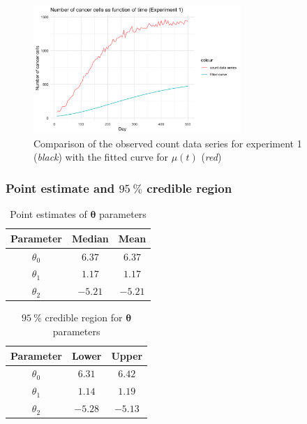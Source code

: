 \begin{figure}[H]
	\centering
	\includegraphics[width=0.7\textwidth]{figures/metropolis_vw_fitted_curve.png}
	\caption{Comparison of the observed count data series for experiment 1 (\textit{black}) with the fitted curve for $\mu(t)$ (\textit{red})}
	\label{fig:metropolis-vw-fitted-curve}
\end{figure}

\subsubsection*{Point estimate and $\SI{95}{\percent}$ credible region}

\begin{table}[H]
	\centering\begin{tabular}{|c|c|c|} \hline 
		Parameter & Median & Mean \\ \hline 
		$\theta_0$ & $6.37$ & $6.37$ \\ 
		$\theta_1$ & $1.17$ & $1.17$ \\
		$\theta_2$ & $-5.21$ & $-5.21$ \\ \hline
	\end{tabular}
	\caption{Point estimates of $\bm{\theta}$ parameters}
	\label{tab:metropolis-cw-point-estimates}
\end{table}

\begin{table}[H]
	\centering\begin{tabular}{|c|c|c|} \hline 
		Parameter & Lower & Upper \\ \hline 
		$\theta_0$ & $6.31$ & $6.42$ \\ 
		$\theta_1$ & $1.14$ & $1.19$ \\
		$\theta_2$ & $-5.28$ & $-5.13$ \\ \hline
	\end{tabular}
	\caption{$\SI{95}{\percent}$ credible region for $\bm{\theta}$ parameters}
	\label{tab:metropolis-cw-credible-region}
\end{table}